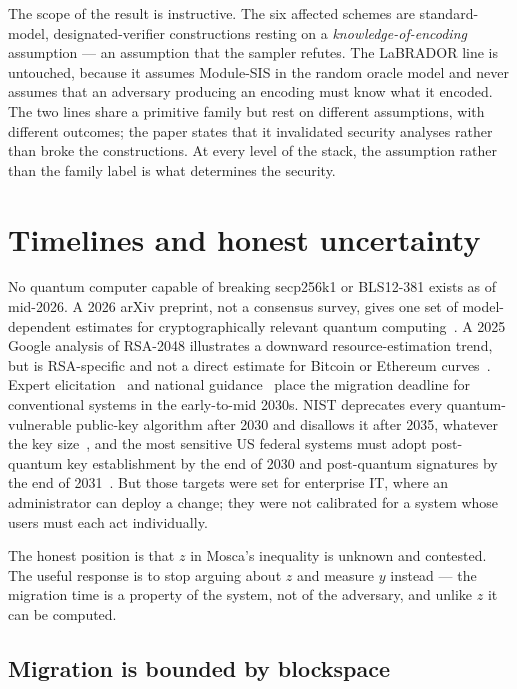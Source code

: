 The scope of the result is instructive. The six affected schemes are
standard-model, designated-verifier constructions resting on a
\emph{knowledge-of-encoding} assumption --- an assumption that the sampler
refutes. The LaBRADOR line is untouched, because it assumes Module-SIS in the
random oracle model and never assumes that an adversary producing an encoding
must know what it encoded. The two lines share a primitive family but rest on
different assumptions, with different outcomes; the paper states that it
invalidated security analyses rather than broke the constructions. At every
level of the stack, the assumption rather than the family label is what
determines the security.

\section{Timelines and honest uncertainty}
No quantum computer capable of breaking secp256k1 or BLS12-381 exists as of mid-2026.
A 2026 arXiv preprint, not a consensus survey, gives one set of model-dependent
estimates for cryptographically relevant quantum computing~\cite{quantumhorizon2026}.
A 2025 Google analysis of RSA-2048 illustrates a downward resource-estimation trend,
but is RSA-specific and not a direct estimate for Bitcoin or Ethereum curves~\cite{gidney2025}.
Expert elicitation~\cite{mosca2025} and national guidance~\cite{nistir8547,ncscpqc2025,cnsa2}
place the migration deadline for conventional systems in the early-to-mid 2030s.
NIST deprecates every quantum-vulnerable public-key algorithm after 2030 and
disallows it after 2035, whatever the key size~\cite{nistir8547}, and the most
sensitive US federal systems must adopt post-quantum key establishment by the end
of 2030 and post-quantum signatures by the end of 2031~\cite{eo14412,ombm2615}.
But those targets were set for enterprise IT, where an administrator can deploy a
change; they were not calibrated for a system whose users must each act
individually.

The honest position is that $z$ in Mosca's inequality is unknown and contested.
The useful response is to stop arguing about $z$ and measure $y$ instead --- the
migration time is a property of the system, not of the adversary, and unlike $z$
it can be computed.

\subsection{Migration is bounded by blockspace}
\label{sec:migration-throughput}


